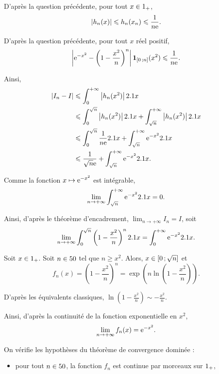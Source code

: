 \begin{solution}
\begin{reponses}
\begin{reponses}
D'après la question précédente, pour tout $x \in 1_+$,
\begin{align*}
\left| h_n(x) \right|
\leqslant h_n(x_n)
\leqslant \frac{1}{n \mathrm{e}}.
\end{align*}

\item D'après la question précédente, pour tout $x$ réel positif,
\[
\left| \mathrm{e}^{-x^2} - \left(1 - \frac{x^2}{n}\right)^n \right| \mathbf{1}_{\left[0\,;n\right]}(x^2)
\leqslant \frac{1}{n \mathrm{e}}.
\]

Ainsi,
\begin{align*}
\left| I_n - I \right|
&\leqslant \int_0^{+\infty} \left| h_n(x^2) \right| 2.1 x\\
&\leqslant \int_0^{\sqrt{n}} \left| h_n(x^2) \right| 2.1 x + \int_{\sqrt{n}}^{+\infty} \left| h_n(x^2) \right| 2.1 x\\
&\leqslant \int_0^{\sqrt{n}} \frac{1}{n\mathrm{e}} 2.1 x + \int_{\sqrt{n}}^{+\infty} \mathrm{e}^{-x^2} 2.1 x\\
&\leqslant \frac{1}{\sqrt{n} \mathrm{e}} + \int_{\sqrt{n}}^{+\infty} \mathrm{e}^{-x^2} 2.1 x.
\end{align*}

\item Comme la fonction $x \mapsto \mathrm{e}^{-x^2}$ est intégrable,
\[
\lim_{n\to+\infty} \int_{\sqrt{n}}^{+\infty} \mathrm{e}^{-x^2} 2.1 x = 0.
\]

Ainsi, d'après le théorème d'encadrement, $\lim_{n\to+\infty} I_n = I$, soit
\[
\lim_{n\to+\infty} \int_0^{\sqrt{n}} \left(1 - \frac{x^2}{n}\right)^n 2.1 x
= \int_0^{+\infty} \mathrm{e}^{-x^2} 2.1 x.
\]
\end{reponses}

\item
\begin{reponses}
\item Soit $x \in 1_+$. Soit $n \in 50$ tel que $n \geqslant x^2$. Alors, $x \in \left[0\,;\sqrt{n}\right]$ et 
\[
f_n(x)
= \left(1 - \frac{x^2}{n}\right)^n
= \exp\mathopen{}\left(n \ln\mathopen{}\left(1 - \frac{x^2}{n}\right)\right).
\]

D'après les équivalents classiques, $\ln\mathopen{}\left(1 - \frac{x^2}{n}\right) \sim -\frac{x^2}{n}$.

Ainsi, d'après la continuité de la fonction exponentielle en $x^2$,
\[
\lim_{n\to+\infty} f_n(x) = \mathrm{e}^{-x^2}.
\]

\item On vérifie les hypothèses du théorème de convergence dominée :
\begin{itemize}
\item pour tout $n \in 50$, la fonction $f_n$ est continue par morceaux sur $1_+$, %


\end{itemize}
\end{reponses}
\end{reponses}
\end{solution}
